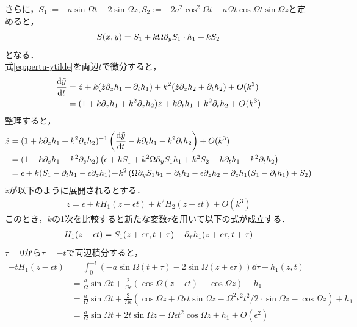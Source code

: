 \documentclass[../main]{subfiles}
\begin{document}
    さらに，$S_1:=-a\sin\Omega t-2\sin\Omega z,S_2:=-2a^2\cos^2\Omega t-a\Omega t\cos \Omega t\sin \Omega z$と定めると，
    \begin{align*}
        S(x,y)=S_1+k\Omega\partial_y S_1\cdot h_1+kS_2
    \end{align*}
    となる．\\
    式\eqref{eq:pertu-ytilde}を両辺$t$で微分すると，
    \begin{align*}
        \dv{\tilde{y}}{t}&=\dot{z}+k(\dot{z}\partial_zh_1+\partial_th_1)+k^2(\dot{z}\partial_zh_2+\partial_th_2)+O(k^3)\\
        &=(1+k\partial_zh_1+k^2\partial_zh_2)\dot{z}+k\partial_th_1+k^2\partial_th_2+O(k^3)
    \end{align*}
    整理すると，
    \begin{align*}
        \dot{z}&=(1+k\partial_zh_1+k^2\partial_zh_2)^{-1}\left( \dv{\tilde{y}}{t}-k\partial_th_1-k^2\partial_th_2 \right)+O(k^3)\\
        &=(1-k\partial_zh_1-k^2\partial_zh_2)\left(\epsilon+kS_1+k^2\Omega \partial_y S_1h_1+k^2S_2-k\partial_th_1-k^2\partial_th_2 \right)\\
        &=\epsilon+k(S_1-\partial_th_1-\epsilon\partial_zh_1)\!+\!k^2\left(\Omega \partial_y S_1h_1 -\partial_th_2-\epsilon\partial_zh_2 -\partial_zh_1(S_1-\partial_th_1)+S_2\right)
    \end{align*}
    $\dot{z}$が以下のように展開されるとする．
    \begin{align*}
        \dot{z}=\epsilon+kH_1(z-\epsilon t)+k^2H_2(z-\epsilon t)+O(k^3)
    \end{align*}
    このとき，$k$の1次を比較すると新たな変数$\tau$を用いて以下の式が成立する．
    \begin{align*}
        H_1(z-\epsilon t)=S_1(z+\epsilon\tau,t+\tau)-\partial_\tau h_1(z+\epsilon\tau,t+\tau)
    \end{align*}
    $\tau=0$から$\tau=-t$で両辺積分すると，
    \begin{align}
        -tH_1(z-\epsilon t)&=\int_0^{-t}\left(-a\sin\Omega(t+\tau)-2\sin\Omega(z+\epsilon\tau)\right)\dd{\tau}+h_1(z,t)\\
        &=\frac{a}{\Omega}\sin\Omega t+\frac{2}{\Omega \epsilon}(\cos \Omega (z-\epsilon t)-\cos \Omega z)+h_1\\
        &=\frac{a}{\Omega}\sin\Omega t+\frac{2}{\Omega \epsilon}(\cos \Omega z+\Omega \epsilon t\sin \Omega z-\Omega^2\epsilon^2t^2/2\cdot\sin \Omega z-\cos \Omega z)+h_1\\
        &=\frac{a}{\Omega}\sin\Omega t+2t\sin \Omega z-\Omega\epsilon t^2\cos \Omega z+h_1+O(\epsilon^2)
        \label{eq-h1-H1}
    \end{align}
\end{document}
